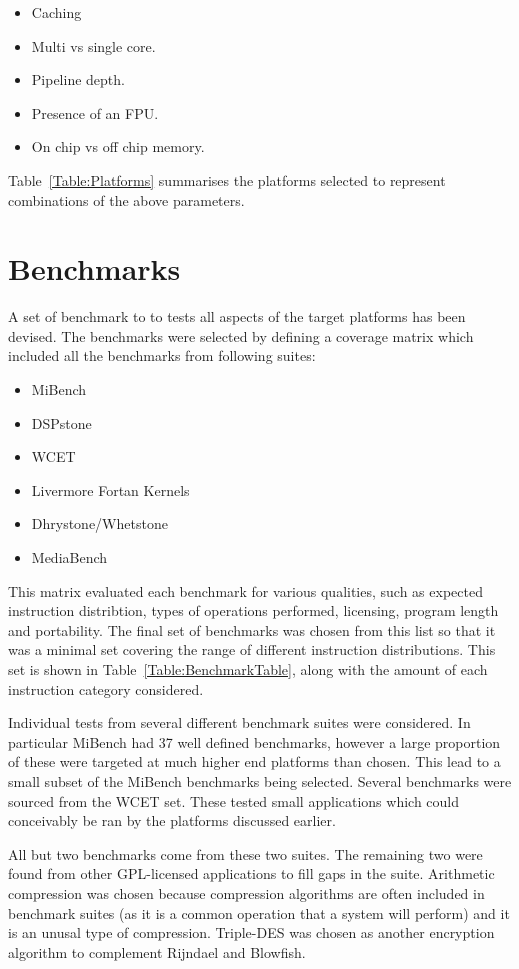 \documentclass[twocolumn]{article}
\newcommand{\nsection}[1]{\section{\bfseries #1}}
\begin{document}
\begin{itemize}
	\setlength{\itemsep}{-0.25em}
	\item Caching
	\item Multi vs single core.
	\item Pipeline depth.
	\item Presence of an FPU.
	\item On chip vs off chip memory.
\end{itemize}

Table~\ref{Table:Platforms} summarises the platforms selected to represent combinations of the above parameters.

\nsection{Benchmarks}

A set of benchmark to to tests all aspects of the target platforms has been devised. The benchmarks were selected by defining a coverage matrix which included all the benchmarks from following suites:
\begin{itemize}
	\setlength{\itemsep}{-0.35em}
	\item MiBench
	\item DSPstone
	\item WCET
	\item Livermore Fortan Kernels
	\item Dhrystone/Whetstone
	\item MediaBench
\end{itemize}

This matrix evaluated each benchmark for various qualities, such as expected instruction distribtion, types of operations performed, licensing, program length and portability. The final set of benchmarks was chosen from this list so that it was a minimal set covering the range of different instruction distributions. This set is shown in Table~\ref{Table:BenchmarkTable}, along with the amount of each instruction category considered.

Individual tests from several different benchmark suites were considered. In particular MiBench had 37 well defined benchmarks, however a large proportion of these were targeted at much higher end platforms than chosen. This lead to a small subset of the MiBench benchmarks being selected. Several benchmarks were sourced from the WCET set. These tested small applications which could conceivably be ran by the platforms discussed earlier.

All but two benchmarks come from these two suites. The remaining two were found from other GPL-licensed applications to fill gaps in the suite. Arithmetic compression was chosen because compression algorithms are often included in benchmark suites (as it is a common operation that a system will perform) and it is an unusal type of compression. Triple-DES was chosen as another encryption algorithm to complement Rijndael and Blowfish.
\end{document}
